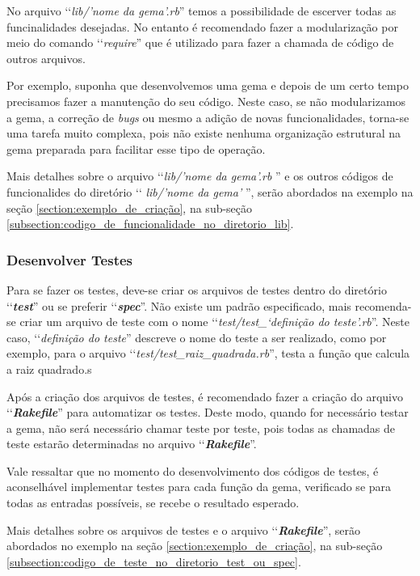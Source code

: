 No arquivo ‘‘\emph{lib/'nome da gema'.rb}'' temos a possibilidade de escerver todas as
funcinalidades desejadas. No entanto é recomendado fazer a modularização por meio do comando
 ‘‘\emph{require}'' que é utilizado para fazer a chamada de código de outros
arquivos.

Por exemplo, suponha que desenvolvemos uma gema e depois de um certo tempo precisamos fazer a manutenção do
seu código. Neste caso, se não modularizamos a gema, a correção de \emph{bugs} ou mesmo a adição de
novas funcionalidades, torna-se uma tarefa muito complexa, pois não existe nenhuma organização
estrutural na gema preparada para facilitar esse tipo de operação.

Mais detalhes sobre o arquivo ‘‘\emph{lib/'nome da gema'.rb} '' e os outros códigos de funcionalides do
diretório ‘‘ \emph{lib/'nome da gema'} '', serão abordados na exemplo na seção
\ref{section:exemplo_de_criação}, na sub-seção \ref{subsection:codigo_de_funcionalidade_no_diretorio_lib}.


\subsubsection{Desenvolver Testes}
\label{subsubsection:desenvolver_testes}


Para se fazer os testes, deve-se criar os arquivos de testes dentro do diretório ‘‘\textbf{\emph{test}}'' ou se
preferir ‘‘\textbf{\emph{spec}}''. Não existe um padrão especificado, mais recomenda-se criar um arquivo de
teste com o nome ‘‘\emph{test/test\_‘definição do teste'.rb}''. Neste caso, ‘‘\emph{definição do teste}''
descreve o nome do teste a ser realizado, como por exemplo, para o arquivo
‘‘\emph{test/test\_raiz\_quadrada.rb}'', testa a função que calcula a raiz quadrado.s

Após a criação dos arquivos de testes, é recomendado fazer a criação do arquivo ‘‘\textbf{\emph{Rakefile}}'' para
automatizar os testes. Deste modo, quando for necessário testar a gema, não será necessário chamar teste
por teste, pois todas as chamadas de teste estarão determinadas no arquivo ‘‘\textbf{\emph{Rakefile}}''.

Vale ressaltar que no momento do desenvolvimento dos códigos de testes, é aconselhável implementar testes
para cada função da gema, verificado se para todas as entradas possíveis, se recebe o resultado
esperado.

Mais detalhes sobre os arquivos de testes e o arquivo ‘‘\textbf{\emph{Rakefile}}'', serão abordados no exemplo
na seção \ref{section:exemplo_de_criação}, na sub-seção \ref{subsection:codigo_de_teste_no_diretorio_test_ou_spec}.


